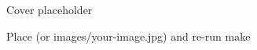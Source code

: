 \thispagestyle{empty}

\vspace*{\fill}
\begin{center}
  {Cover placeholder\par}
  \vspace{1em}
  {Place  (or images/your-image.jpg) and re-run make\par}
\end{center}
\vspace*{\fill}